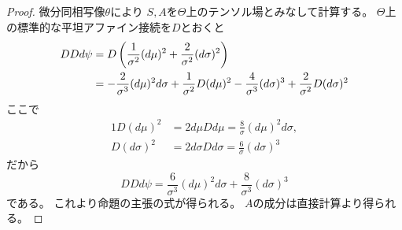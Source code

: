\documentclass[report]{jlreq}
\begin{document}
\begin{proof}
    微分同相写像$\theta$により
    $S, A$を$\Theta$上のテンソル場とみなして計算する。
    $\Theta$上の標準的な平坦アファイン接続を$D$とおくと
    \begin{alignat}{1}
        DDd\psi
            &=
                D \left({
                    \frac{1}{\sigma^2} (d\mu)^2
                    + \frac{2}{\sigma^2} (d\sigma)^2
                }\right)
                \\
            &=
                - \frac{2}{\sigma^3} (d\mu)^2 d\sigma
                + \frac{1}{\sigma^2} D(d\mu)^2
                - \frac{4}{\sigma^3} (d\sigma)^3
                + \frac{2}{\sigma^2} D(d\sigma)^2
    \end{alignat}
    ここで
    \begin{alignat}{1}
        D(d\mu)^2
            &=
                2 d\mu Dd\mu
            =
                \frac{8}{\sigma} (d\mu)^2 d\sigma,
                \\
        D(d\sigma)^2
            &=
                2 d\sigma Dd\sigma
            =
                \frac{6}{\sigma} (d\sigma)^3
    \end{alignat}
    だから
    \begin{equation}
        DDd\psi
            =
                \frac{6}{\sigma^3} (d\mu)^2 d\sigma
                + \frac{8}{\sigma^3} (d\sigma)^3
    \end{equation}
    である。
    これより命題の主張の式が得られる。
    $A$の成分は直接計算より得られる。
\end{proof}
\end{document}
